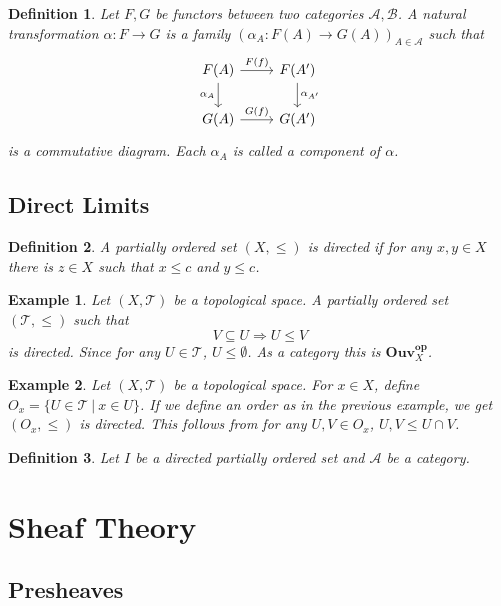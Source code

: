 \documentclass{article}
\newtheorem{definition}{Definition}[section]
\newtheorem{example}{Example}[section]
\numberwithin{equation}{section}
\begin{document}
\begin{definition}
Let $F,G$ be functors between two categories $\mathcal{A},\mathcal{B}$. A natural transformation $\alpha:F\to G$ is a family $(\alpha_A:F(A)\to G(A))_{A\in\mathcal{A}}$ such that 
\[ \begin{tikzcd}
F(A) \arrow{r}{F(f)} \arrow[swap]{d}{\alpha_A} & F(A') \arrow{d}{\alpha_{A'}} \\%
G(A) \arrow{r}{G(f)}& G(A')
\end{tikzcd}
\]
is a commutative diagram. Each $\alpha_A$ is called a component of $\alpha$. 
 \label{natural_transformation}
\end{definition}

\subsection{Direct Limits}

\begin{definition}
A partially ordered set $(X,\leq)$ is directed if for any $x,y\in X$ there is $z\in X$ such that $x\leq c$ and $y\leq c$.
\end{definition}

\begin{example}
Let $(X,\mathcal{T})$ be a topological space. A partially ordered set $(\mathcal{T},\leq)$ such that 
\begin{equation*}
V\subseteq U\Rightarrow U\leq V
\end{equation*}
is directed. Since for any $U\in\mathcal{T}$, $U\leq \emptyset$. As a category this is $\mathbf{Ouv}_X^{\mathbf{op}}$.
\end{example}

\begin{example}
Let $(X,\mathcal{T})$ be a topological space. For $x\in X$, define$O_x = \{U\in\mathcal{T}\:|\: x\in U\}$. If we define an order as in the previous example, we get $(O_x,\leq)$ is directed. This follows from for any $U,V\in O_x$, $U,V\leq U\cap V$.  
\end{example}

\begin{definition}
Let $I$ be a directed partially ordered set and $\mathcal{A}$ be a category. 
\end{definition}

\section{Sheaf Theory}

\subsection{Presheaves}
\end{document}
